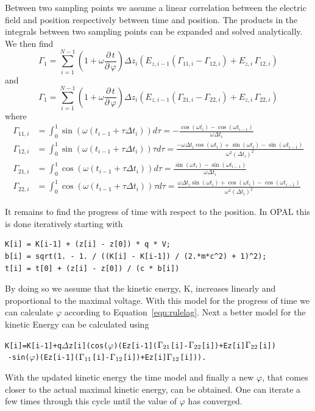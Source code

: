 \documentclass[automark,a4paper,11pt,headsepline]{scrartcl}
\begin{document}
Between two sampling points we assume a linear correlation between the electric field and position respectively between time and position. The products in the  integrals between two sampling points can be expanded and solved analytically. We then find
\begin{equation*}
\Gamma_1 = \sum_{i=1}^{N-1} (1 + \omega \frac{\partial\,t}{\partial\,\varphi}) \Delta z_{i}(E_{z,i-1} (\Gamma_{11,i} - \Gamma_{12,i}) + E_{z,i}\, \Gamma_{12,i})
\end{equation*}
and
\begin{equation*}
\Gamma_1 = \sum_{i=1}^{N-1} (1 + \omega \frac{\partial\,t}{\partial\,\varphi}) \Delta z_{i}(E_{z,i-1} (\Gamma_{21,i} - \Gamma_{22,i}) + E_{z,i}\, \Gamma_{22,i})
\end{equation*}
where
\begin{align*}
  \Gamma_{11,i} &= \int_0^1 \sin(\omega(t_{i-1} + \tau \Delta t_{i})) d\tau = - \frac{\cos(\omega t_{i}) - \cos(\omega t_{i-1})}{\omega \Delta t_{i}}\\
  \Gamma_{12,i} &= \int_0^1 \sin(\omega(t_{i-1} + \tau \Delta t_{i})) \tau d\tau = \frac{-\omega \Delta t_{i} \cos(\omega t_{i}) + \sin(\omega t_{i}) - \sin(\omega t_{i-1})}{\omega^2 (\Delta t_{i})^2}\\
  \Gamma_{21,i} &= \int_0^1 \cos(\omega(t_{i-1} + \tau \Delta t_{i})) d\tau = \frac{\sin(\omega t_{i}) - \sin(\omega t_{i-1})}{\omega \Delta t_{i}}\\
  \Gamma_{22,i} &= \int_0^1 \cos(\omega(t_{i-1} + \tau \Delta t_{i})) \tau d\tau = \frac{\omega \Delta t_{i} \sin(\omega t_{i}) + \cos(\omega t_{i}) - \cos(\omega t_{i-1})}{\omega^2 (\Delta t_{i})^2}
\end{align*}

It remains to find the progress of time with respect to the position. In OPAL this is done iteratively starting with 
\begin{verbatim}
K[i] = K[i-1] + (z[i] - z[0]) * q * V;
b[i] = sqrt(1. - 1. / ((K[i] - K[i-1]) / (2.*m*c^2) + 1)^2);
t[i] = t[0] + (z[i] - z[0]) / (c * b[i])
\end{verbatim}
By doing so we assume that the kinetic energy, K, increases linearly and proportional to the maximal voltage. With this model for the progress of time we can calculate $\varphi$ according to Equation~\ref{eqn:rulelag}. Next a better model for the kinetic Energy can be calculated using 
\begin{alltt}
K[i] = K[i-1] + q \(\Delta\)z[i](cos(\(\varphi\))(Ez[i-1](\(\Gamma\sb{21}\)[i] - \(\Gamma\sb{22}\)[i]) + Ez[i]\(\Gamma\sb{22}\)[i]) 
                      \(\,\,\)- sin(\(\varphi\))(Ez[i-1](\(\Gamma\sb{11}\)[i] - \(\Gamma\sb{12}\)[i]) + Ez[i]\(\Gamma\sb{12}\)[i])).
\end{alltt}
With the updated kinetic energy the time model and finally a new $\varphi$, that comes closer to the actual maximal kinetic energy, can be obtained. One can iterate a few times through this cycle until the value of $\varphi$ has converged.
\end{document}
